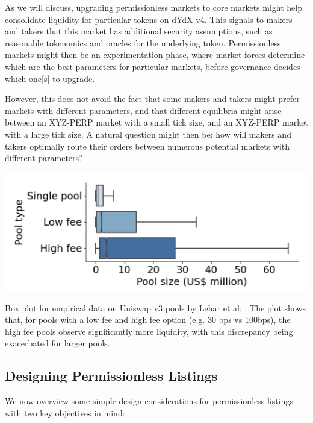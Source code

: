             As we will discuss, upgrading permissionless markets to core markets might help consolidate liquidity for particular tokens on dYdX v4. This signals to makers and takers that this market has additional security assumptions, such as reasonable tokenomics and oracles for the underlying token. Permissionless markets might then be an experimentation phase, where market forces determine which are the best parameters for particular markets, before governance decides which one[s] to upgrade.
            
            However, this does not avoid the fact that some makers and takers might prefer markets with different parameters, and that different equilibria might arise between an XYZ-PERP market with a small tick size, and an XYZ-PERP market with a large tick size. A natural question might then be: how will makers and takers optimally route their orders between numerous potential markets with different parameters?

            \begin{marginfigure}
                \centering
                \includegraphics[width=\linewidth]{figs/sizes.png}
                \captionsetup{width=\linewidth}
                \caption{Box plot for empirical data on Uniswap v3 pools by Lehar et al. \cite{lehar2023liquidity}. The plot shows that, for pools with a low fee and high fee option (e.g. 30 bps vs 100bps), the high fee pools observe significantly more liquidity, with this discrepancy being exacerbated for larger pools.}
            \end{marginfigure}


        \subsection{Designing Permissionless Listings}

            We now overview some simple design considerations for permissionless listings with two key objectives in mind:

